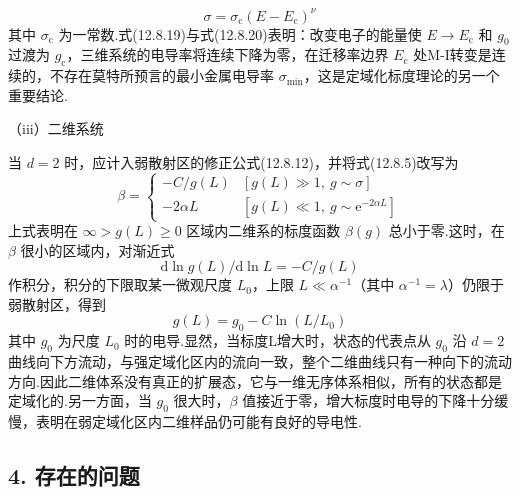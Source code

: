 \begin{equation}
  \sigma=\sigma_{\mathrm{c}}\left(E-E_{\mathrm{c}}\right)^{\nu}
\end{equation}
其中 $\sigma_{\mathrm{c}}$ 为一常数.式(12.8.19)与式(12.8.20)表明：改变电子的能量使 $E\rightarrow E_{\mathrm{c}}$ 和 $g_{0}$ 过渡为 $g_{\mathrm{c}}$，三维系统的电导率将连续下降为零，在迁移率边界 $E_{\mathrm{c}}$ 处M-I转变是连续的，不存在莫特所预言的最小金属电导率 $\sigma_{\mathrm{min}}$，这是定域化标度理论的另一个重要结论.

（iii）二维系统

当 $d=2$ 时，应计入弱散射区的修正公式(12.8.12)，并将式(12.8.5)改写为
\begin{equation}
  \beta=
  \begin{cases}
    -C/g\left(L\right) & \left[g\left(L\right)\gg1,\ g\sim\sigma\right]\\
    -2\alpha L & \left[g\left(L\right)\ll1,\ g\sim\mathrm{e}^{-2\alpha L}\right]
  \end{cases}
\end{equation}
上式表明在 $\infty>g\left(L\right)\geqslant0$ 区域内二维系的标度函数 $\beta\left(g\right)$ 总小于零.这时，在 $\beta$ 很小的区域内，对渐近式
\begin{equation*}
  \mathrm{d}\ln g\left(L\right)/\mathrm{d}\ln L=-C/g\left(L\right)
\end{equation*}
作积分，积分的下限取某一微观尺度 $L_{0}$，上限 $L\ll\alpha^{-1}$（其中 $\alpha^{-1}=\lambda$）仍限于弱散射区，得到
\begin{equation*}
  g\left(L\right)=g_{0}-C\ln\left(L/L_{0}\right)
\end{equation*}
其中 $g_{0}$ 为尺度 $L_{0}$ 时的电导.显然，当标度L增大时，状态的代表点从 $g_{0}$ 沿 $d=2$ 曲线向下方流动，与强定域化区内的流向一致，整个二维曲线只有一种向下的流动方向.因此二维体系没有真正的扩展态，它与一维无序体系相似，所有的状态都是定域化的.另一方面，当 $g_{0}$ 很大时，$\beta$ 值接近于零，增大标度时电导的下降十分缓慢，表明在弱定域化区内二维样品仍可能有良好的导电性.

\subsection*{4. 存在的问题}

